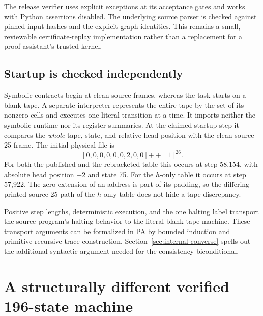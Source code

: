 \documentclass[11pt,letterpaper]{article}
\begin{document}
The release verifier uses explicit exceptions at its acceptance gates and
works with Python assertions disabled. The underlying source parser is
checked against pinned input hashes and the explicit graph identities.
This remains a small, reviewable certificate-replay implementation rather
than a replacement for a proof assistant's trusted kernel.

\subsection{Startup is checked independently}
Symbolic contracts begin at clean source frames, whereas the task starts on
a blank tape. A separate interpreter represents the entire tape by the set
of its nonzero cells and executes one literal transition at a time. It
imports neither the symbolic runtime nor its register summaries.
At the claimed startup step it compares the \emph{whole} tape, state, and
relative head position with the clean source-25 frame. The initial physical
file is
\[
       [0,0,0,0,0,0,2,0,0]\mathbin{+\!+}[1]^{26}.
\]
For both the published and the rebracketed table this occurs at step 58,154,
with absolute head position $-2$ and state 75. For the $h$-only table it occurs
at step 57,922. The zero extension of an address is part of its padding, so
the differing printed source-25 path of the $h$-only table does not hide a
tape discrepancy.

Positive step lengths, deterministic execution, and the one halting label
transport the source program's halting behavior to the literal blank-tape
machine. These transport arguments can be formalized in PA by bounded
induction and primitive-recursive trace construction. Section~\ref{sec:internal-converse}
spells out the additional syntactic argument needed for the consistency
biconditional.

\section{A structurally different verified 196-state machine}
\label{sec:rebracketed}
\end{document}
